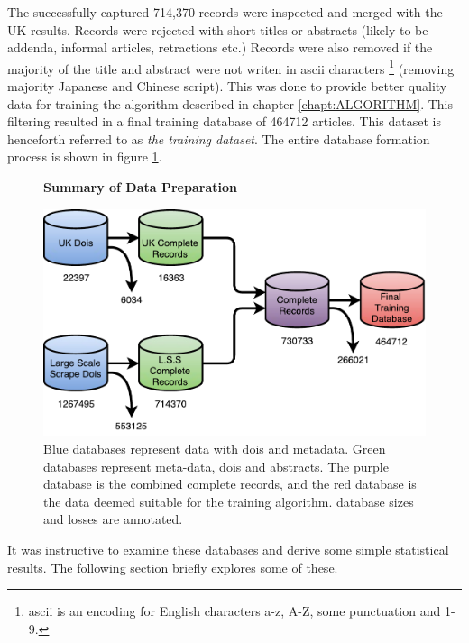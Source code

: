 The successfully captured 714,370 records were inspected and merged with the UK results. Records were rejected with short titles or abstracts (likely to be addenda, informal articles, retractions etc.) Records were also removed if the majority of the title and abstract were not writen in ascii characters \footnote{ascii is an encoding for English characters a-z, A-Z, some punctuation and 1-9.} (removing majority Japanese and Chinese script). This was done to provide better quality data for training the algorithm described in chapter \ref{chapt:ALGORITHM}. This filtering resulted in a final training database of 464712 articles. This dataset is henceforth referred to as \emph{the training dataset}. The entire database formation process is shown in figure \ref{fig:DATABASES}.
\begin{figure}[H]
    \centering
    \textbf{Summary of Data Preparation}\par\medskip
    \includegraphics[scale=0.6]{Data_Acquisition/Databases.pdf}
    \caption{Blue databases represent data with dois and metadata. Green databases represent meta-data, dois and abstracts. The purple database is the combined complete records, and the red database is the data deemed suitable for the training algorithm. database sizes and losses are annotated.}
     \label{fig:DATABASES}
\end{figure}


It was instructive to examine these databases and derive some simple statistical results. The following section briefly explores some of these.
